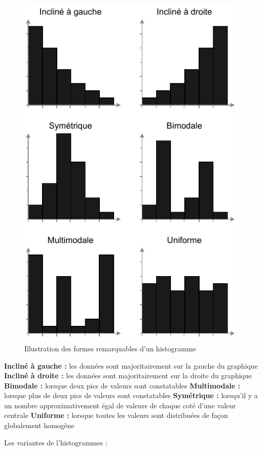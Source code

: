 \documentclass[a4paper,12pt]{article}
\begin{document}
\begin{multicols}{2}
\begin{figure}[H]
\centering
\includegraphics[width=.9\linewidth]{./img/histogram-patterns.pdf}
\caption{\label{fig:Patterns-histogram}Illustration des formes remarquables d'un histogramme}
\end{figure}

\textbf{Incliné à gauche :} les données sont majoritairement sur la gauche du graphique
\textbf{Incliné à droite :} les données sont majoritairement sur la droite du graphique
\textbf{Bimodale :} lorsque deux pics de valeurs sont constatables
\textbf{Multimodale :} lorsque plus de deux pics de valeurs sont constatables
\textbf{Symétrique :} lorsqu'il y a un nombre approximativement égal de valeurs de chaque coté d'une valeur centrale
\textbf{Uniforme :} lorsque toutes les valeurs sont distribuées de façon globalement homogène

Les variantes de l'histogrammes :


\end{multicols}
\end{document}
